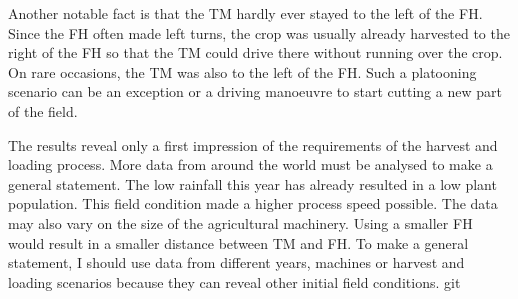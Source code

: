 Another notable fact is that the \ac{TM} hardly ever stayed to the left of the \ac{FH}.
Since the \ac{FH} often made left turns, the crop was usually already harvested to the right of the \ac{FH} so
that the \ac{TM} could drive there without running over the crop.
On rare occasions, the \ac{TM} was also to the left of the \ac{FH}.
Such a platooning scenario can be an exception or a driving manoeuvre to start cutting a new part of the field.

The results reveal only a first impression of the requirements of the harvest and loading process.
More data from around the world must be analysed to make a general statement.
The low rainfall this year has already resulted in a low plant population.
This field condition made a higher process speed possible.
The data may also vary on the size of the agricultural machinery.
Using a smaller \ac{FH} would result in a smaller distance between \ac{TM} and \ac{FH}.
To make a general statement, I should use data from different years, machines or harvest and loading scenarios
because they can reveal other initial field conditions.
git

